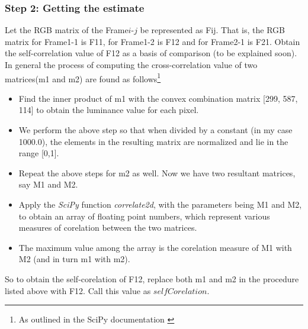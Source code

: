 \documentclass[10pt, letter]{article}
\begin{document}
\subsubsection*{Step 2: Getting the estimate}
Let the RGB matrix of the Frame$i$-$j$ be represented as Fij. That is, the RGB matrix for Frame1-1 is F11, for Frame1-2 is F12 and for Frame2-1 is F21. Obtain the self-correlation value of F12 as a basis of comparison (to be explained soon). In general the process of computing the cross-correlation value of two matrices(m1 and m2) are found as follows\footnote{As outlined in the SciPy documentation \cite{web}}
	\begin{itemize}
		\item Find the inner product of m1 with the convex combination matrix \cite{math} [299, 587, 114] to obtain the luminance value for each pixel.
		\item We perform the above step so that when divided by a constant (in my case 1000.0), the elements in the resulting matrix are normalized and lie in the range [0,1].
		\item Repeat the above steps for m2 as well. Now we have two resultant matrices, say M1 and M2.
		\item Apply the \emph{SciPy} function \cite{web} \emph{correlate2d}, with the parameters being M1 and M2, to obtain an array of floating point numbers, which represent various measures of corelation between the two matrices.
		\item The maximum value among the array is the corelation measure of M1 with M2 (and in turn m1 with m2).
	\end{itemize}
So to obtain the self-corelation of F12, replace both m1 and m2 in the procedure listed above with F12. Call this value as $selfCorelation$.
\end{document}
